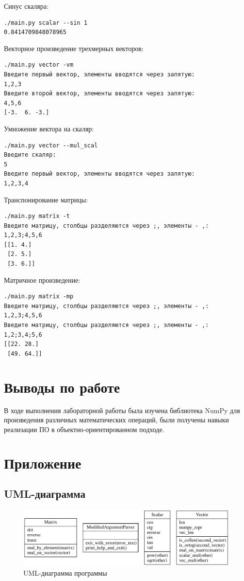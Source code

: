 \documentclass[a4paper,14pt]{extarticle}
\begin{document}
Синус скаляра: 
\begin{verbatim}
./main.py scalar --sin 1
0.8414709848078965
\end{verbatim}

Векторное произведение трехмерных векторов:
\begin{verbatim}
./main.py vector -vm 
Введите первый вектор, элементы вводятся через запятую:
1,2,3
Введите второй вектор, элементы вводятся через запятую:
4,5,6
[-3.  6. -3.]
\end{verbatim}

Умножение вектора на скаляр:
\begin{verbatim}
./main.py vector --mul_scal
Введите скаляр:
5 
Введите первый вектор, элементы вводятся через запятую:
1,2,3,4
\end{verbatim}

Транспонирование матрицы:
\begin{verbatim}
./main.py matrix -t 
Введите матрицу, столбцы разделяются через ;, элементы - ,:
1,2,3;4,5,6
[[1. 4.]
 [2. 5.]
 [3. 6.]]
\end{verbatim}

Матричное произведение:
\begin{verbatim}
./main.py matrix -mp 
Введите матрицу, столбцы разделяются через ;, элементы - ,:
1,2,3;4,5,6
Введите матрицу, столбцы разделяются через ;, элементы - ,:
1,2;3,4;5,6
[[22. 28.]
 [49. 64.]]
\end{verbatim}

\section*{Выводы по работе}
В ходе выполнения лабораторной работы была изучена библиотека NumPy для произведения различных математических операций, были получены навыки реализации ПО в объектно-ориентированном подходе.

\newpage

\section*{Приложение}

\subsection*{UML-диаграмма}
\begin{figure}[H]
	\includegraphics[width=\textwidth]{include/uml_diagram.pdf}
	\caption{UML-диаграмма программы}
\end{figure}
\end{document}
